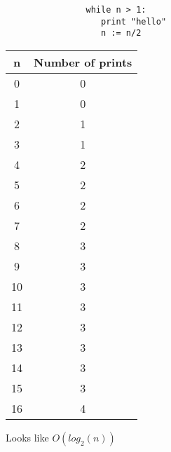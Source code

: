 \documentclass[12pt]{article}
\begin{document}
\begin{enumerate}
\begin{enumerate}
			\begin{verbatim}
			    while n > 1:
			       print "hello"
			       n := n/2
			\end{verbatim}
			\begin{tabular}{|c|c|}\hline
				n &  Number of prints  \\ \hline
				0 & 0	\\ \hline
				1 & 0	\\ \hline
				2 & 1	\\ \hline
				3 & 1	\\ \hline
				4 & 2	\\ \hline
				5 & 2	\\ \hline
				6 & 2	\\ \hline
				7 & 2	\\ \hline
				8 & 3	\\ \hline
				9 & 3	\\ \hline
				10 & 3	\\ \hline
				11 & 3	\\ \hline
				12 & 3	\\ \hline
				13 & 3	\\ \hline
				14 & 3	\\ \hline
				15 & 3	\\ \hline
				16 & 4	\\ \hline
			\end{tabular}
		\hspace{10mm}
		Looks like $O(log_2(n))$

\end{enumerate}

\end{enumerate}
\end{document}
